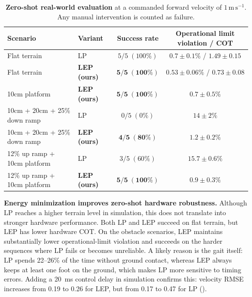 \documentclass{article}
\newcommand{\baselineTwo}{LP}
\newcommand{\baselineFour}{LEP}
\begin{document}
    \begin{table}[t]
        \centering
        \footnotesize
        \caption{\textbf{Zero-shot real-world evaluation} at a commanded forward velocity of \(1\,\mathrm{m\,s^{-1}}\). Any manual intervention is counted as failure.}
        \label{tab:sim2real-results}
        \setlength{\tabcolsep}{4pt}
        \renewcommand{\arraystretch}{1.08}
        \begin{tabularx}{\linewidth}{@{}lYcc@{}}
            \toprule
            \textbf{Scenario} & \textbf{Variant} & \textbf{Success rate} & \textbf{Operational limit violation / COT} \\
            \midrule
            Flat terrain & \baselineTwo & \(5/5\; (100\%)\) & \(0.7 \pm 0.1\%\) / \(1.49 \pm 0.15\) \\
            Flat terrain & \textbf{\baselineFour{} (ours)} & \(\mathbf{5/5\; (100\%)}\) & \(\mathbf{0.53 \pm 0.06\%}\) / \(\mathbf{0.73 \pm 0.08}\) \\
            \midrule
            10cm platform & \textbf{\baselineFour{} (ours)} & \(\mathbf{5/5\; (100\%)}\) & \(\mathbf{0.7 \pm 0.5\%}\) \\
            10cm + 20cm + 25\% down ramp & \baselineTwo & \(0/5\; (0\%)\) & \(14 \pm 2\%\) \\
            10cm + 20cm + 25\% down ramp & \textbf{\baselineFour{} (ours)} & \(\mathbf{4/5\; (80\%)}\) & \(\mathbf{1.2 \pm 0.2\%}\) \\
            12\% up ramp + 10cm platform & \baselineTwo & \(3/5\; (60\%)\) & \(15.7 \pm 0.6\%\) \\
            12\% up ramp + 10cm platform & \textbf{\baselineFour{} (ours)} & \(\mathbf{5/5\; (100\%)}\) & \(\mathbf{0.9 \pm 0.3\%}\) \\
            \bottomrule
        \end{tabularx}
    \end{table}
    
    \textbf{Energy minimization improves zero-shot hardware robustness.}
    Although \baselineTwo{} reaches a higher terrain level in simulation, this does not translate into stronger hardware performance. 
    Both \baselineTwo{} and \baselineFour{} succeed on flat terrain, but \baselineFour{} has lower hardware COT. 
    On the obstacle scenarios, \baselineFour{} maintains substantially lower operational-limit violation and succeeds on the harder sequences where \baselineTwo{} fails or becomes unreliable.
    A likely reason is the gait itself: \baselineTwo{} spends 22--26\% of the time without ground contact, whereas \baselineFour{} always keeps at least one foot on the ground, which makes \baselineTwo{} more sensitive to timing errors. Adding a \SI{20}{\milli\second} control delay in simulation confirms this: velocity RMSE increases from 0.19 to 0.26 for \baselineFour{}, but from 0.17 to 0.47 for \baselineTwo{} ().
\end{document}
